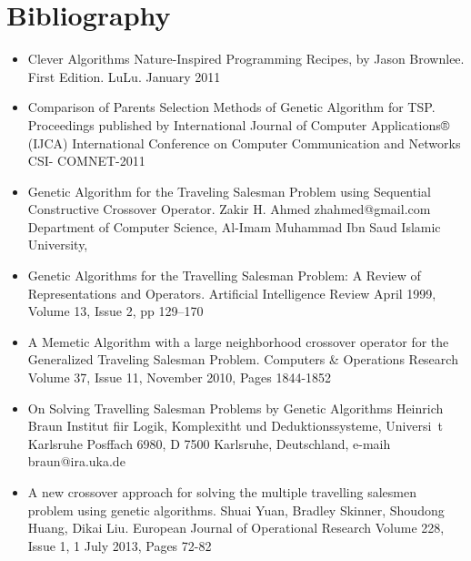 \documentclass{article}
\begin{document}
\section{Bibliography}
\begin{itemize}
    \item Clever Algorithms Nature-Inspired Programming Recipes, by Jason Brownlee. First Edition. LuLu. January 2011
    \item Comparison of Parents Selection Methods of Genetic Algorithm for TSP. Proceedings published by International Journal of Computer Applications® (IJCA)
    International Conference on Computer Communication and Networks CSI- COMNET-2011
    \item Genetic Algorithm for the Traveling Salesman Problem using Sequential Constructive Crossover Operator. Zakir H. Ahmed zhahmed@gmail.com
    Department of Computer Science, Al-Imam Muhammad Ibn Saud Islamic University,
    \item Genetic Algorithms for the Travelling Salesman Problem: A Review of Representations and Operators. Artificial Intelligence Review
    April 1999, Volume 13, Issue 2, pp 129–170
    \item A Memetic Algorithm with a large neighborhood crossover operator for the Generalized Traveling Salesman Problem. Computers \& Operations Research
    Volume 37, Issue 11, November 2010, Pages 1844-1852
    \item On Solving Travelling Salesman Problems by Genetic Algorithms Heinrich Braun Institut fiir Logik, Komplexitht und Deduktionssysteme, Universi~t Karlsruhe Posffach 6980, 
    D 7500 Karlsruhe, Deutschland, e-maih braun@ira.uka.de
    \item A new crossover approach for solving the multiple travelling salesmen problem using genetic algorithms.
    Shuai Yuan, Bradley Skinner, Shoudong Huang, Dikai Liu. European Journal of Operational Research
    Volume 228, Issue 1, 1 July 2013, Pages 72-82
\end{itemize}
\end{document}
